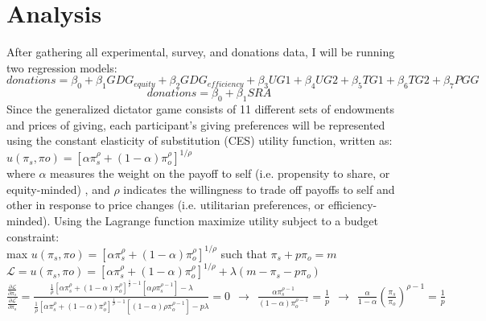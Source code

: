 \documentclass{article}
\begin{document}
\section{Analysis}

After gathering all experimental, survey, and donations data, I will be running two regression models:
\begin{equation}
donations= \beta_{0} + \beta_{1} GDG_{equity}+ \beta_{2} GDG_{efficiency} + \beta_{3} UG1 + \beta_{4} UG2 + \beta_{5} TG1 + \beta_{6} TG2 + \beta_{7} PGG
\end{equation}
\begin{equation}
donations = \beta_{0} + \beta_{1} SRA
\end{equation}
Since the generalized dictator game consists of 11 different sets of endowments and prices of giving, each participant's giving preferences will be represented using the constant elasticity of substitution (CES) utility function, written as: \\

\(u(\pi_{s}, \pi{o}) = [\alpha\pi_{s}^{\rho} + (1-\alpha)\pi_{o}^{\rho}]^{1/ \rho }\) \\

\noindent
where \(\alpha\) measures the weight on the payoff to self (i.e. propensity to share, or equity-minded) , and \(\rho\) indicates the willingness to trade off payoffs to self and other in response to price changes (i.e. utilitarian preferences, or efficiency-minded). Using the Lagrange function maximize utility subject to a budget constraint: \\

max \(u(\pi_{s}, \pi{o}) = [\alpha\pi_{s}^{\rho} + (1-\alpha)\pi_{o}^{\rho}]^{1/ \rho }\) such that \(\pi_{s} + p\pi_{o} = m\) \\

\(\mathcal{L} = u(\pi_{s}, \pi{o}) = [\alpha\pi_{s}^{\rho} + (1-\alpha)\pi_{o}^{\rho}]^{1/ \rho } + \lambda (m-\pi_{s}-p\pi_{o})\) \\

\(\frac{\frac{\partial \mathcal{L}}{\partial \pi_{s}}}{\frac{\partial \mathcal{L}}{\partial \pi_{o}}} = \frac{\frac{1}{\rho}[\alpha\pi_{s}^{\rho} + (1-\alpha)\pi_{o}^{\rho}]^{\frac{1}{\rho} -1}[\alpha\rho\pi_{s}^{\rho-1}]-\lambda}{\frac{1}{\rho}[\alpha\pi_{s}^{\rho} + (1-\alpha)\pi_{o}^{\rho}]^{\frac{1}{\rho} -1}[(1-\alpha)\rho\pi_{o}^{\rho-1}] - p\lambda} = 0 \ \ \longrightarrow \ \ \frac{\alpha\pi_{s}^{\rho-1}}{(1-\alpha)\pi_{o}^{\rho-1}} = \frac{1}{p} \ \ \longrightarrow \ \ \frac{\alpha}{1-\alpha}(\frac{\pi_{s}}{\pi_{o}})^{\rho-1} = \frac{1}{p}\) 
 \\
 
\end{document}
